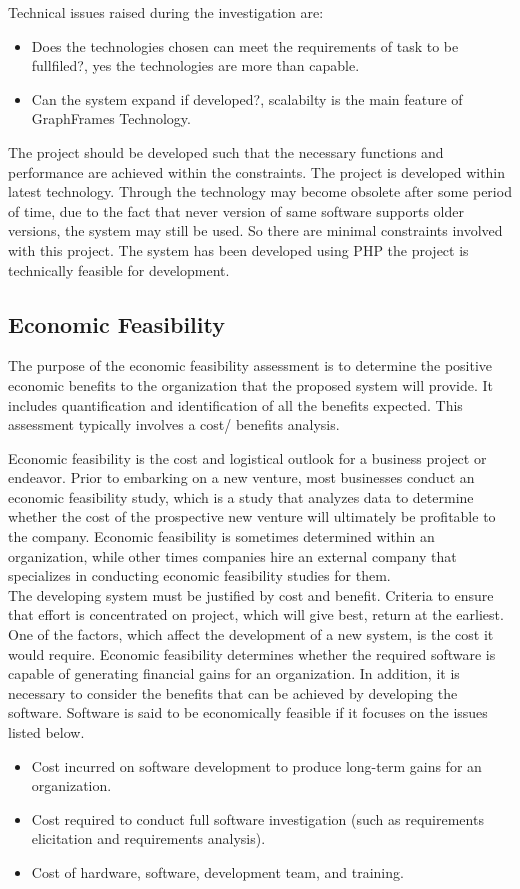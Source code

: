 Technical issues raised during the investigation are:
\begin{itemize}
	\item Does the technologies chosen can meet the requirements of task to be fullfiled?, yes the technologies are more than capable.
	\item Can the system expand if developed?, scalabilty is the main feature of GraphFrames Technology.
\end{itemize}

The project should be developed such that the necessary functions and performance are achieved within the constraints. The project is developed within latest technology. Through the technology may become obsolete after some period of time, due to the fact that never version of same software supports older versions, the system may still be used. So there are minimal constraints involved with this project. The system has been developed using PHP the project is technically feasible for development.

\subsection{Economic Feasibility}
The purpose of the economic feasibility assessment is to determine the positive economic benefits to the organization that the proposed system will provide. It includes quantification and identification of all the benefits expected. This assessment typically involves a cost/ benefits analysis.

Economic feasibility is the cost and logistical outlook for a business project or endeavor. Prior to embarking on a new venture, most businesses conduct an economic feasibility study, which is a study that analyzes data to determine whether the cost of the prospective new venture will ultimately be profitable to the company. Economic feasibility is sometimes determined within an organization, while other times companies hire an external company that specializes in conducting economic feasibility studies for them.\\
The developing system must be justified by cost and benefit. Criteria to ensure that effort is concentrated on project, which will give best, return at the earliest. One of the factors, which affect the development of a new system, is the cost it would require. Economic feasibility determines whether the required software is capable of generating financial gains for an organization. In addition, it is necessary to consider the benefits that can be achieved by developing the software. Software is said to be economically feasible if it focuses on the issues listed below.
\begin{itemize}
	\item Cost incurred on software development to produce long-term gains for an organization.
	\item Cost required to conduct full software investigation (such as requirements elicitation and requirements analysis).
	\item Cost of hardware, software, development team, and training.
\end{itemize}

